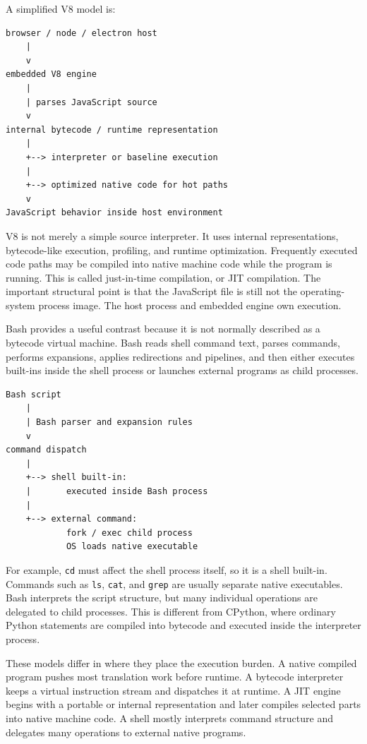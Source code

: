 \documentclass[a4paper,twoside]{report}
\begin{document}
A simplified V8 model is:

\begin{verbatim}
browser / node / electron host
    |
    v
embedded V8 engine
    |
    | parses JavaScript source
    v
internal bytecode / runtime representation
    |
    +--> interpreter or baseline execution
    |
    +--> optimized native code for hot paths
    v
JavaScript behavior inside host environment
\end{verbatim}

V8 is not merely a simple source interpreter. It uses internal representations, bytecode-like execution, profiling, and runtime optimization. Frequently executed code paths may be compiled into native machine code while the program is running. This is called just-in-time compilation, or JIT compilation. The important structural point is that the JavaScript file is still not the operating-system process image. The host process and embedded engine own execution.

Bash provides a useful contrast because it is not normally described as a bytecode virtual machine. Bash reads shell command text, parses commands, performs expansions, applies redirections and pipelines, and then either executes built-ins inside the shell process or launches external programs as child processes.

\begin{verbatim}
Bash script
    |
    | Bash parser and expansion rules
    v
command dispatch
    |
    +--> shell built-in:
    |       executed inside Bash process
    |
    +--> external command:
            fork / exec child process
            OS loads native executable
\end{verbatim}

For example, \texttt{cd} must affect the shell process itself, so it is a shell built-in. Commands such as \texttt{ls}, \texttt{cat}, and \texttt{grep} are usually separate native executables. Bash interprets the script structure, but many individual operations are delegated to child processes. This is different from CPython, where ordinary Python statements are compiled into bytecode and executed inside the interpreter process.

These models differ in where they place the execution burden. A native compiled program pushes most translation work before runtime. A bytecode interpreter keeps a virtual instruction stream and dispatches it at runtime. A JIT engine begins with a portable or internal representation and later compiles selected parts into native machine code. A shell mostly interprets command structure and delegates many operations to external native programs.
\end{document}
